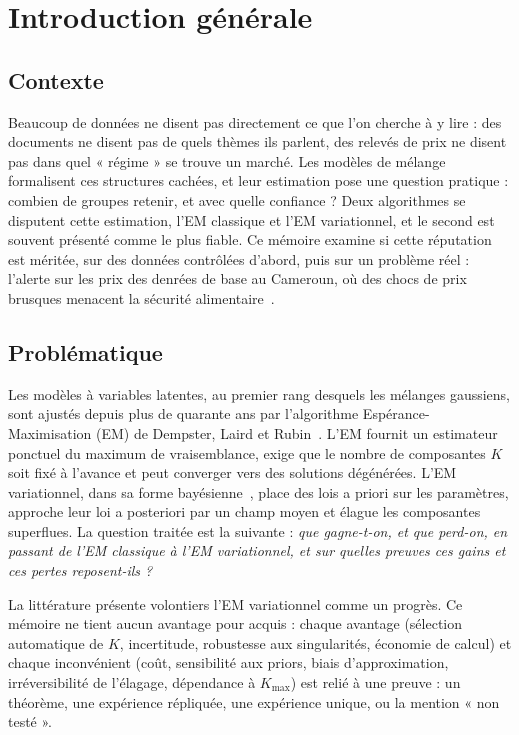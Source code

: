 \chapter*{Introduction générale}

\section*{Contexte}
Beaucoup de données ne disent pas directement ce que l'on cherche à y lire : des documents ne disent pas de quels thèmes ils parlent, des relevés de prix ne disent pas dans quel « régime » se trouve un marché. Les modèles de mélange formalisent ces structures cachées, et leur estimation pose une question pratique : combien de groupes retenir, et avec quelle confiance ? Deux algorithmes se disputent cette estimation, l'EM classique et l'EM variationnel, et le second est souvent présenté comme le plus fiable. Ce mémoire examine si cette réputation est méritée, sur des données contrôlées d'abord, puis sur un problème réel : l'alerte sur les prix des denrées de base au Cameroun, où des chocs de prix brusques menacent la sécurité alimentaire~\cite{giews2026,fewsnet2026,pam2023bulletin}.

\section*{Problématique}
Les modèles à variables latentes, au premier rang desquels les mélanges gaussiens, sont ajustés depuis plus de quarante ans par l'algorithme Espérance-Maximisation (EM) de Dempster, Laird et Rubin~\cite{dempster1977}. L'EM fournit un estimateur ponctuel du maximum de vraisemblance, exige que le nombre de composantes $K$ soit fixé à l'avance et peut converger vers des solutions dégénérées. L'EM variationnel, dans sa forme bayésienne~\cite{attias2000,bishop2006}, place des lois a priori sur les paramètres, approche leur loi a posteriori par un champ moyen et élague les composantes superflues. La question traitée est la suivante : \emph{que gagne-t-on, et que perd-on, en passant de l'EM classique à l'EM variationnel, et sur quelles preuves ces gains et ces pertes reposent-ils ?}

La littérature présente volontiers l'EM variationnel comme un progrès. Ce mémoire ne tient aucun avantage pour acquis : chaque avantage (sélection automatique de $K$, incertitude, robustesse aux singularités, économie de calcul) et chaque inconvénient (coût, sensibilité aux priors, biais d'approximation, irréversibilité de l'élagage, dépendance à $K_{\max}$) est relié à une preuve : un théorème, une expérience répliquée, une expérience unique, ou la mention « non testé ».

